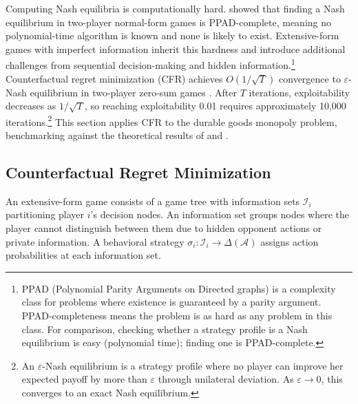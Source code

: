 
Computing Nash equilibria is computationally hard. \citet{Daskalakis2009} showed that finding a Nash equilibrium in two-player normal-form games is PPAD-complete, meaning no polynomial-time algorithm is known and none is likely to exist. Extensive-form games with imperfect information inherit this hardness and introduce additional challenges from sequential decision-making and hidden information.\footnote{PPAD (Polynomial Parity Arguments on Directed graphs) is a complexity class for problems where existence is guaranteed by a parity argument. PPAD-completeness means the problem is as hard as any problem in this class. For comparison, checking whether a strategy profile is a Nash equilibrium is easy (polynomial time); finding one is PPAD-complete.} Counterfactual regret minimization (CFR) achieves $O(1/\sqrt{T})$ convergence to $\varepsilon$-Nash equilibrium in two-player zero-sum games \citep{zinkevich2008}. After $T$ iterations, exploitability decreases as $1/\sqrt{T}$, so reaching exploitability 0.01 requires approximately 10,000 iterations.\footnote{An $\varepsilon$-Nash equilibrium is a strategy profile where no player can improve her expected payoff by more than $\varepsilon$ through unilateral deviation. As $\varepsilon \to 0$, this converges to an exact Nash equilibrium.} This section applies CFR to the durable goods monopoly problem, benchmarking against the theoretical results of \citet{gul1986foundations} and \citet{ausubel1989reputation}.

\subsection{Counterfactual Regret Minimization}

An extensive-form game consists of a game tree with information sets $\mathcal{I}_i$ partitioning player $i$'s decision nodes. An information set groups nodes where the player cannot distinguish between them due to hidden opponent actions or private information. A behavioral strategy $\sigma_i: \mathcal{I}_i \to \Delta(\mathcal{A})$ assigns action probabilities at each information set.


